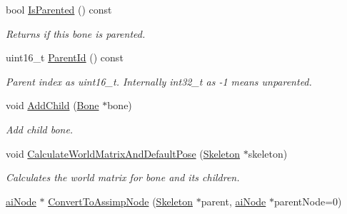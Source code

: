 \begin{DoxyCompactItemize}
\item 
\hypertarget{class_assimp_1_1_ogre_1_1_bone_aa394d46812c9ab9430a44b0d52f11d0d}{bool \hyperlink{class_assimp_1_1_ogre_1_1_bone_aa394d46812c9ab9430a44b0d52f11d0d}{Is\+Parented} () const }\label{class_assimp_1_1_ogre_1_1_bone_aa394d46812c9ab9430a44b0d52f11d0d}

\begin{DoxyCompactList}\small\item\em Returns if this bone is parented. \end{DoxyCompactList}\item 
\hypertarget{class_assimp_1_1_ogre_1_1_bone_a0c8d7883fed7e2510237baa66f101fed}{uint16\+\_\+t \hyperlink{class_assimp_1_1_ogre_1_1_bone_a0c8d7883fed7e2510237baa66f101fed}{Parent\+Id} () const }\label{class_assimp_1_1_ogre_1_1_bone_a0c8d7883fed7e2510237baa66f101fed}

\begin{DoxyCompactList}\small\item\em Parent index as uint16\+\_\+t. Internally int32\+\_\+t as -\/1 means unparented. \end{DoxyCompactList}\item 
\hypertarget{class_assimp_1_1_ogre_1_1_bone_a13a3acbd459260ec6514eda67671c948}{void \hyperlink{class_assimp_1_1_ogre_1_1_bone_a13a3acbd459260ec6514eda67671c948}{Add\+Child} (\hyperlink{class_assimp_1_1_ogre_1_1_bone}{Bone} $\ast$bone)}\label{class_assimp_1_1_ogre_1_1_bone_a13a3acbd459260ec6514eda67671c948}

\begin{DoxyCompactList}\small\item\em Add child bone. \end{DoxyCompactList}\item 
\hypertarget{class_assimp_1_1_ogre_1_1_bone_a3bf8ffe66efd832179eabf3e97ecdbe1}{void \hyperlink{class_assimp_1_1_ogre_1_1_bone_a3bf8ffe66efd832179eabf3e97ecdbe1}{Calculate\+World\+Matrix\+And\+Default\+Pose} (\hyperlink{class_assimp_1_1_ogre_1_1_skeleton}{Skeleton} $\ast$skeleton)}\label{class_assimp_1_1_ogre_1_1_bone_a3bf8ffe66efd832179eabf3e97ecdbe1}

\begin{DoxyCompactList}\small\item\em Calculates the world matrix for bone and its children. \end{DoxyCompactList}\item 
\hypertarget{class_assimp_1_1_ogre_1_1_bone_a209f40d91f35fba6233002085f55289b}{\hyperlink{structai_node}{ai\+Node} $\ast$ \hyperlink{class_assimp_1_1_ogre_1_1_bone_a209f40d91f35fba6233002085f55289b}{Convert\+To\+Assimp\+Node} (\hyperlink{class_assimp_1_1_ogre_1_1_skeleton}{Skeleton} $\ast$parent, \hyperlink{structai_node}{ai\+Node} $\ast$parent\+Node=0)}\label{class_assimp_1_1_ogre_1_1_bone_a209f40d91f35fba6233002085f55289b}


\end{DoxyCompactItemize}

